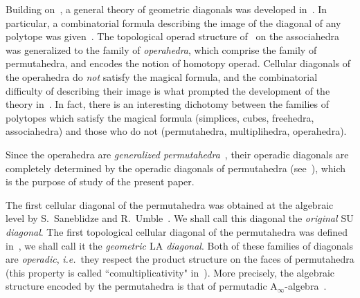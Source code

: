 \documentclass{amsart}
\theoremstyle{definition}
\newcommand{\ie}{\textit{i.e.}~} %
\newcommand{\SU}{\mathrm{SU}}
\newcommand{\LA}{\mathrm{LA}}
\newcommand{\Ainf}{\ensuremath{\mathrm{A}_\infty}}
\begin{document}
Building on~\cite{MasudaThomasTonksVallette}, a general theory of geometric diagonals was developed in~\cite{LaplanteAnfossi}.
In particular, a combinatorial formula describing the image of the diagonal of any polytope was given~\cite[Thm.~1.26]{LaplanteAnfossi}.
The topological operad structure of~\cite{MasudaThomasTonksVallette} on the associahedra was generalized to the family of \emph{operahedra}, which comprise the family of permutahedra, and encodes the notion of homotopy operad.
Cellular diagonals of the operahedra do \emph{not} satisfy the magical formula, and the combinatorial difficulty of describing their image is what prompted the development of the theory in~\cite{LaplanteAnfossi}.
In fact, there is an interesting dichotomy between the families of polytopes which satisfy the magical formula (simplices, cubes, freehedra, associahedra) and those who do not (permutahedra, multiplihedra, operahedra).

Since the operahedra are \emph{generalized permutahedra}~\cite{Postnikov}, their operadic diagonals are completely determined by the operadic diagonals of permutahedra (see~\cite[Sect.~1.6]{LaplanteAnfossi}), which is the purpose of study of the present paper.

The first cellular diagonal of the permutahedra was obtained at the algebraic level by S.~Sanebli\-dze and R.~Umble~\cite{SaneblidzeUmble}.
We shall call this diagonal the \emph{original $\SU$ diagonal}. 
The first topological cellular diagonal of the permutahedra was defined in~\cite{LaplanteAnfossi}, we shall call it the \emph{geometric $\LA$ diagonal}.
Both of these families of diagonals are \emph{operadic}, \ie they respect the product structure on the faces of permutahedra (this property is called ``comultiplicativity" in~\cite{SaneblidzeUmble}).
More precisely, the algebraic structure encoded by the permutahedra is that of permutadic $\Ainf$-algebra~\cite{LodayRonco-permutads,Markl}.
\end{document}
